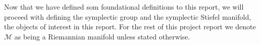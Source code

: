 Now that we have defined som foundational definitions to this report, we will proceed with defining the symplectic group and the symplectic Stiefel manifold, the objects of interest in this report. For the rest of this project report we denote $\mathcal{M}$ as being a Riemannian manifold unless stated otherwise.








